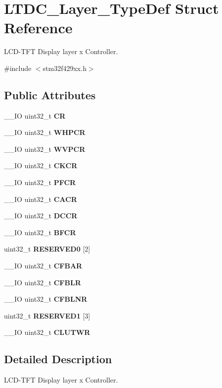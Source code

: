 \section{L\+T\+D\+C\+\_\+\+Layer\+\_\+\+Type\+Def Struct Reference}
\label{structLTDC__Layer__TypeDef}


L\+C\+D-\/\+T\+FT Display layer x Controller.  




{\ttfamily \#include $<$stm32f429xx.\+h$>$}

\subsection*{Public Attributes}
\begin{DoxyCompactItemize}
\item 
\+\_\+\+\_\+\+IO uint32\+\_\+t \textbf{ CR}
\item 
\+\_\+\+\_\+\+IO uint32\+\_\+t \textbf{ W\+H\+P\+CR}
\item 
\+\_\+\+\_\+\+IO uint32\+\_\+t \textbf{ W\+V\+P\+CR}
\item 
\+\_\+\+\_\+\+IO uint32\+\_\+t \textbf{ C\+K\+CR}
\item 
\+\_\+\+\_\+\+IO uint32\+\_\+t \textbf{ P\+F\+CR}
\item 
\+\_\+\+\_\+\+IO uint32\+\_\+t \textbf{ C\+A\+CR}
\item 
\+\_\+\+\_\+\+IO uint32\+\_\+t \textbf{ D\+C\+CR}
\item 
\+\_\+\+\_\+\+IO uint32\+\_\+t \textbf{ B\+F\+CR}
\item 
uint32\+\_\+t \textbf{ R\+E\+S\+E\+R\+V\+E\+D0} [2]
\item 
\+\_\+\+\_\+\+IO uint32\+\_\+t \textbf{ C\+F\+B\+AR}
\item 
\+\_\+\+\_\+\+IO uint32\+\_\+t \textbf{ C\+F\+B\+LR}
\item 
\+\_\+\+\_\+\+IO uint32\+\_\+t \textbf{ C\+F\+B\+L\+NR}
\item 
uint32\+\_\+t \textbf{ R\+E\+S\+E\+R\+V\+E\+D1} [3]
\item 
\+\_\+\+\_\+\+IO uint32\+\_\+t \textbf{ C\+L\+U\+T\+WR}
\end{DoxyCompactItemize}


\subsection{Detailed Description}
L\+C\+D-\/\+T\+FT Display layer x Controller. 

